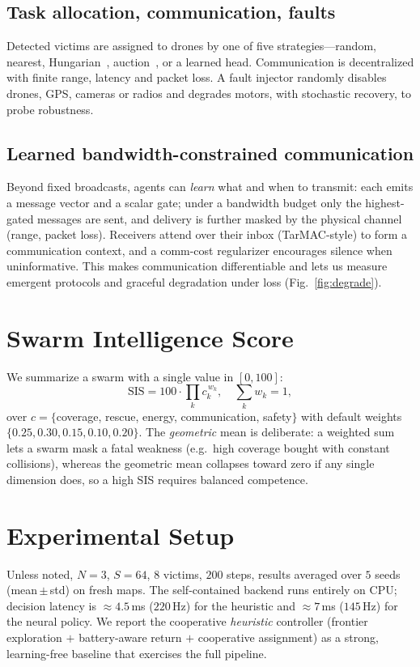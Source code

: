 \documentclass[twocolumn,10pt]{article}
\begin{document}
\subsection{Task allocation, communication, faults}
Detected victims are assigned to drones by one of five strategies---random,
nearest, Hungarian~\cite{kuhn1955hungarian}, auction~\cite{bertsekas1988auction},
or a learned head. Communication is decentralized with finite range, latency and
packet loss. A fault injector randomly disables drones, GPS, cameras or radios and
degrades motors, with stochastic recovery, to probe robustness.

\subsection{Learned bandwidth-constrained communication}
Beyond fixed broadcasts, agents can \emph{learn} what and when to transmit: each
emits a message vector and a scalar gate; under a bandwidth budget only the
highest-gated messages are sent, and delivery is further masked by the physical
channel (range, packet loss). Receivers attend over their inbox (TarMAC-style) to
form a communication context, and a comm-cost regularizer encourages silence when
uninformative. This makes communication differentiable and lets us measure emergent
protocols and graceful degradation under loss (Fig.~\ref{fig:degrade}).

\section{Swarm Intelligence Score}
We summarize a swarm with a single value in $[0,100]$:
\begin{equation}
\mathrm{SIS} = 100 \cdot \prod_{k} c_k^{\,w_k}, \quad \sum_k w_k = 1,
\end{equation}
over $c=\{$coverage, rescue, energy, communication, safety$\}$ with default weights
$\{0.25,0.30,0.15,0.10,0.20\}$. The \emph{geometric} mean is deliberate: a weighted
sum lets a swarm mask a fatal weakness (e.g.\ high coverage bought with constant
collisions), whereas the geometric mean collapses toward zero if any single
dimension does, so a high SIS requires balanced competence.

\section{Experimental Setup}
Unless noted, $N=3$, $S=64$, $8$ victims, $200$ steps, results averaged over $5$
seeds (mean\,$\pm$\,std) on fresh maps. The self-contained backend runs entirely on
CPU; decision latency is $\approx 4.5$\,ms ($220$\,Hz) for the heuristic and
$\approx 7$\,ms ($145$\,Hz) for the neural policy. We report the cooperative
\emph{heuristic} controller (frontier exploration $+$ battery-aware return $+$
cooperative assignment) as a strong, learning-free baseline that exercises the full
pipeline.
\end{document}
